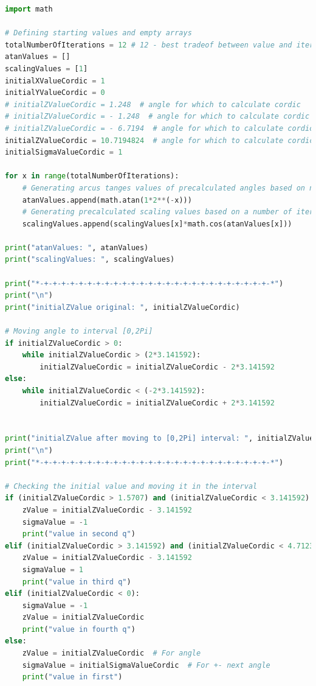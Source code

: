 \documentclass[a4paper, twoside, 11pt]{article}
\begin{document}
\begin{lstlisting}[language={python}, caption={Python code of \gls{abbreviation:cordic} implementation.}, label= {lst:python-cordic}]
import math

# Defining starting values and empty arrays
totalNumberOfIterations = 12 # 12 - best tradeof between value and iterations
atanValues = []
scalingValues = [1]
initialXValueCordic = 1
initialYValueCordic = 0
# initialZValueCordic = 1.248  # angle for which to calculate cordic
# initialZValueCordic = - 1.248  # angle for which to calculate cordic
# initialZValueCordic = - 6.7194  # angle for which to calculate cordic
initialZValueCordic = 10.7194824  # angle for which to calculate cordic
initialSigmaValueCordic = 1

for x in range(totalNumberOfIterations):
    # Generating arcus tanges values of precalculated angles based on number of iterations
    atanValues.append(math.atan(1*2**(-x)))
    # Generating precalculated scaling values based on a number of iterations
    scalingValues.append(scalingValues[x]*math.cos(atanValues[x]))

print("atanValues: ", atanValues)
print("scalingValues: ", scalingValues)

print("*-+-+-+-+-+-+-+-+-+-+-+-+-+-+-+-+-+-+-+-+-+-+-+-+-+-+-*")
print("\n")
print("initialZValue original: ", initialZValueCordic)

# Moving angle to interval [0,2Pi]
if initialZValueCordic > 0:
    while initialZValueCordic > (2*3.141592):
        initialZValueCordic = initialZValueCordic - 2*3.141592
else:
    while initialZValueCordic < (-2*3.141592):
        initialZValueCordic = initialZValueCordic + 2*3.141592


print("initialZValue after moving to [0,2Pi] interval: ", initialZValueCordic)
print("\n")
print("*-+-+-+-+-+-+-+-+-+-+-+-+-+-+-+-+-+-+-+-+-+-+-+-+-+-+-*")

# Checking the initial value and moving it in the interval
if (initialZValueCordic > 1.5707) and (initialZValueCordic < 3.141592):
    zValue = initialZValueCordic - 3.141592
    sigmaValue = -1
    print("value in second q")
elif (initialZValueCordic > 3.141592) and (initialZValueCordic < 4.7123):
    zValue = initialZValueCordic - 3.141592
    sigmaValue = 1
    print("value in third q")
elif (initialZValueCordic < 0):
    sigmaValue = -1
    zValue = initialZValueCordic
    print("value in fourth q")
else:
    zValue = initialZValueCordic  # For angle
    sigmaValue = initialSigmaValueCordic  # For +- next angle
    print("value in first")


\end{lstlisting}
\end{document}
